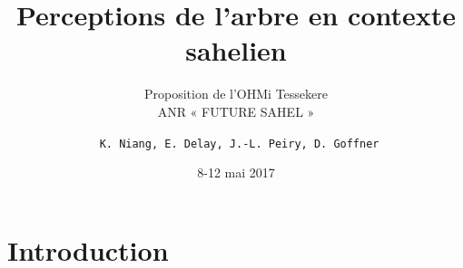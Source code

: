 \documentclass[newPxFont]{beamer}
\title{Perceptions de l’arbre en contexte sahelien}
\subtitle{Proposition de l’OHMi Tessekere \\
 ANR « FUTURE SAHEL »}
\date{8-12 mai 2017}
\author{\texttt{ K. Niang, E. Delay, J.-L. Peiry, D. Goffner}}
\institute{\textsc{Ohm} Téssékéré - Sénégal}
\begin{document}
%
%

\maketitle


%
%


\section{Introduction}
\end{document}
